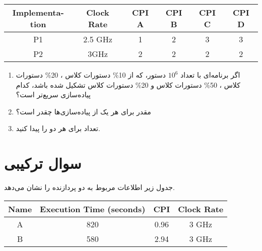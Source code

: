 \documentclass[11pt]{article}
\newcommand{\hosna}{حسنا رجایی }
\newcommand{\cpi}{\lr{CPI} }
\begin{document}
\begin{table}[H]
    \begin{latin}
        \begin{center}
            \begin{tabular}{|c|c|c|c|c|c|}
                \hline
                Implementation & Clock Rate & CPI A & CPI B & CPI C & CPI D \\
                \hline
                P1 & 2.5 GHz & 1 & 2 & 3 & 3 \\
                \hline
                P2 & 3GHz & 2 &  2 & 2 &  2 \\
                \hline
            \end{tabular}
        \end{center}
    \end{latin}
\end{table}

\begin{enumerate}
    \item 
    اگر برنامه‌ای با تعداد 
    $10^6$
    دستور، که از 
    10\% دستورات کلاس ،
    20\% دستورات کلاس ،
    50\% دستورات کلاس  و
    20\% دستورات کلاس  
    تشکیل شده باشد، کدام پیاده‌سازی سریع‌تر است؟
    \item 
    مقدر \cpi برای هر یک از پیاده‌سازی‌ها چقدر است؟
    \item 
    تعداد  برای هر دو را پیدا‌ کنید.
\end{enumerate}

\section[سوال ترکیبی]{سوال ترکیبی\RTLfootnote{\hosna}}
جدول زیر اطلاعات مربوط به دو پردازنده را نشان می‌دهد.
\begin{table}[H]
    \begin{latin}
        \begin{center}
            \begin{tabular}{|c|c|c|c|}
                \hline
                Name & Execution Time (seconds) & CPI & Clock Rate \\
                \hline
                \hline
                A & 820 & 0.96 & 3 GHz \\
                \hline
                B & 580 & 2.94 & 3 GHz \\
                \hline
            \end{tabular}
        \end{center}
    \end{latin}
\end{table}
\end{document}
